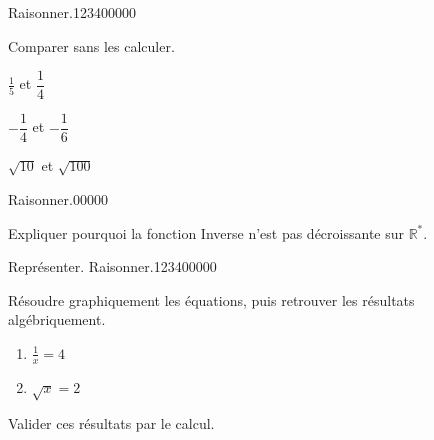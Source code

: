 \begin{pageAD}  %
\restoregeometry %




\begin{ExoCad}{Raisonner.}{1234}{0}{0}{0}{0}{0}

Comparer sans les calculer.
\begin{description}[leftmargin=*]
\item $\frac{1}{5}$ et $\dfrac{1}{4}$  

\item $-\dfrac{1}{4}$ et $-\dfrac{1}{6}$ 

\item $\sqrt{10}$ et $\sqrt{100}$ 

\end{description}

\end{ExoCad} 


\begin{ExoCadN}{Raisonner.}{0}{0}{0}{0}{0}

Expliquer pourquoi la fonction Inverse n'est pas décroissante sur $\mathbb{R}^\ast$.

\end{ExoCadN}
 

 

 

\begin{ExoCad}{Représenter. Raisonner.}{1234}{0}{0}{0}{0}{0}

Résoudre graphiquement les équations, puis retrouver les résultats algébriquement.
\begin{enumerate}[leftmargin=*]
\item $\frac{1}{x}=4$ 
\item $\sqrt{x}=2$ 
\end{enumerate}
Valider ces résultats par le calcul.

\vspace{0.4cm}

\begin{minipage}{0.48\linewidth}
\end{minipage}
\hfill
\begin{minipage}{0.48\linewidth}
\end{minipage}

\end{ExoCad}



\end{pageAD}
